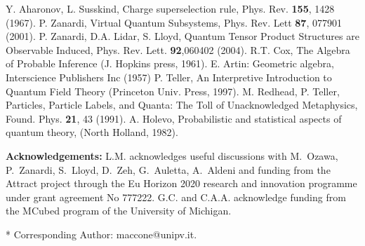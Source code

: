 \documentclass[aps,prl,amsmath,amssymb,twocolumn,nofootinbib]{revtex4}
\theoremstyle{plain}
\theoremstyle{definition}
\theoremstyle{remark}
\begin{document}
\begin{references}
Y. Aharonov, L. Susskind, Charge superselection
  rule, Phys. Rev. {\bf 155}, 1428 (1967).
P. Zanardi, Virtual Quantum Subsystems, Phys. Rev.
  Lett {\bf 87}, 077901 (2001).
 P. Zanardi, D.A. Lidar, S. Lloyd, Quantum
  Tensor Product Structures are Observable Induced, Phys. Rev. Lett.
  {\bf 92},060402 (2004).
R.T. Cox, The Algebra of Probable Inference (J. Hopkins
  press, 1961).
 E. Artin: Geometric algebra, Interscience Publishers Inc (1957)
P. Teller, An Interpretive Introduction to Quantum
  Field Theory (Princeton Univ. Press, 1997).  
M. Redhead, P. Teller, Particles, Particle Labels, and
  Quanta: The Toll of Unacknowledged Metaphysics, Found. Phys. {\bf
    21}, 43 (1991).
A. Holevo, Probabilistic and statistical aspects of
  quantum theory, (North Holland, 1982).
\end{references}

\baselineskip
{\bf Acknowledgements:} L.M. acknowledges useful discussions with
M.~Ozawa, P.~Zanardi, S.~Lloyd, D.~Zeh, G.~Auletta, A.~Aldeni and
funding from the Attract project through the Eu Horizon 2020 research
and innovation programme under grant agreement No 777222. G.C. and
C.A.A. acknowledge funding from the MCubed program of the University
of Michigan.

* Corresponding Author: maccone@unipv.it.
\end{document}
